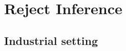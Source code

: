 \documentclass[english,xcolor={rgb,dvipsnames,table,usenames}]{beamer}
\DeclareMathOperator*{\argmin}{\arg\!\min}
\newcommand{\yslant}{0.5}
\newcommand{\xslant}{-0.6}
\begin{document}
%
%
%
%
%
%
%
%
%
%
%
%
%
%
%
%
%
%
%





\section{Reject Inference}

\subsection{Industrial setting}
\end{document}
